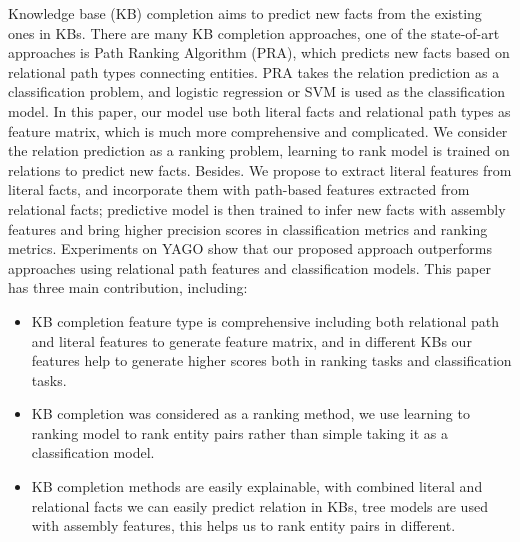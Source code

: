 
\begin{eabstract}
Knowledge base (KB) completion aims to predict new facts
from the existing ones in KBs. There are many KB completion approaches,
one of the state-of-art approaches is Path Ranking Algorithm
(PRA), which predicts new facts based on relational path types connecting entities.
PRA takes the relation prediction as a classification problem, and
logistic regression or SVM is used as the classification model. In this paper, our model
use both literal facts and relational path types as feature matrix, which is much more comprehensive and complicated. We
consider the relation prediction as a ranking problem, learning to rank
model is trained on relations to predict new facts. Besides. We propose to extract literal features from literal facts, and incorporate them with path-based
features extracted from relational facts; predictive
model is then trained to infer new
facts with assembly features and bring higher precision scores in classification metrics and ranking metrics. Experiments on YAGO show that our proposed approach outperforms approaches using relational path features and classification models.
This paper has three main contribution, including:
\begin{itemize}[$\bullet$]
    \item KB completion feature type is comprehensive including both relational path and literal features to generate feature matrix, and in different KBs our features help to generate higher scores both in ranking tasks and classification tasks.
    \item KB completion was considered as a ranking method, we use learning to ranking model to rank entity pairs rather than simple taking it as a classification model.
    \item KB completion methods are easily explainable, with combined literal and relational facts we can easily predict relation in KBs, tree models are used with assembly features, this helps us to rank entity pairs in different.
  \end{itemize}

\end{eabstract}

